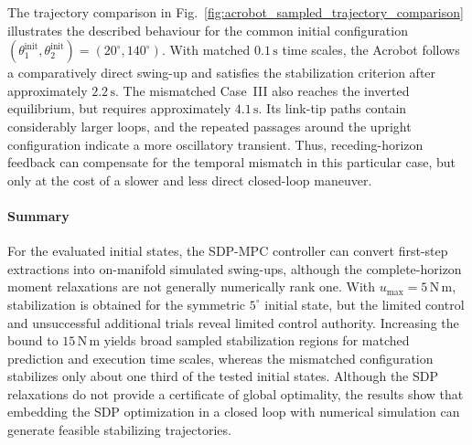 The trajectory comparison in
Fig.~\ref{fig:acrobot_sampled_trajectory_comparison} illustrates the described
behaviour for the common initial configuration
$(\theta_1^{\mathrm{init}},\theta_2^{\mathrm{init}})
=(20^\circ,140^\circ)$. With matched $0.1\,\mathrm{s}$ time scales, the
Acrobot follows a comparatively direct swing-up and satisfies the stabilization
criterion after approximately $2.2\,\mathrm{s}$. The mismatched Case~III also
reaches the inverted equilibrium, but requires approximately $4.1\,\mathrm{s}$.
Its link-tip paths contain considerably larger loops, and the repeated passages
around the upright configuration indicate a more oscillatory transient. Thus,
receding-horizon feedback can compensate for the temporal mismatch in this
particular case, but only at the cost of a slower and less direct
closed-loop maneuver.

\paragraph{Summary}
For the evaluated initial states, the SDP-MPC controller can convert first-step
extractions into on-manifold simulated swing-ups, although the complete-horizon
moment relaxations are not generally numerically rank one. With
$u_{\max}=5\,\mathrm{N\,m}$, stabilization is obtained for the symmetric
$5^\circ$ initial state, but the limited control and unsuccessful additional
trials reveal limited control authority. Increasing the bound to
$15\,\mathrm{N\,m}$ yields broad sampled stabilization regions for matched
prediction and execution time scales, whereas the mismatched configuration
stabilizes only about one third of the tested initial states.
Although the SDP relaxations do not provide a certificate of global optimality, 
the results show that embedding the SDP optimization in a closed loop with numerical 
simulation can generate feasible stabilizing trajectories.







